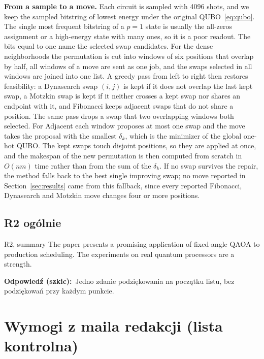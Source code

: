 \documentclass[11pt,a4paper]{article}
\newcommand{\odp}{\par\textbf{\sffamily Odpowiedź (szkic):}\ }
\begin{document}
\begin{pozmianie}
\textbf{From a sample to a move.} Each circuit is sampled with 4096 shots, and we keep the sampled bitstring of lowest energy under the original QUBO~\eqref{eq:qubo}. The single most frequent bitstring of a $p=1$ state is usually the all-zeros assignment or a high-energy state with many ones, so it is a poor readout. The bits equal to one name the selected swap candidates. For the dense neighborhoods the permutation is cut into windows of six positions that overlap by half, all windows of a move are sent as one job, and the swaps selected in all windows are joined into one list. A greedy pass from left to right then restores feasibility: a Dynasearch swap $(i,j)$ is kept if it does not overlap the last kept swap, a Motzkin swap is kept if it neither crosses a kept swap nor shares an endpoint with it, and Fibonacci keeps adjacent swaps that do not share a position. The same pass drops a swap that two overlapping windows both selected. For Adjacent each window proposes at most one swap and the move takes the proposal with the smallest $\delta_k$, which is the minimizer of the global one-hot QUBO. The kept swaps touch disjoint positions, so they are applied at once, and the makespan of the new permutation is then computed from scratch in $O(nm)$ time rather than from the sum of the $\delta_k$. If no swap survives the repair, the method falls back to the best single improving swap; no move reported in Section~\ref{sec:results} came from this fallback, since every reported Fibonacci, Dynasearch and Motzkin move changes four or more positions.
\end{pozmianie}

\subsection*{R2 ogólnie}
\begin{rev}{R2, summary}
The paper presents a promising application of fixed-angle QAOA to production scheduling. The experiments on real quantum processors are a strength.
\end{rev}
\odp Jedno zdanie podziękowania na początku listu, bez podziękowań przy każdym punkcie.

\section{Wymogi z maila redakcji (lista kontrolna)}
\end{document}
